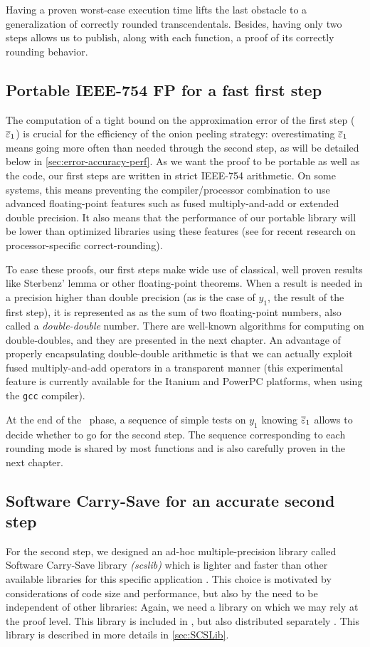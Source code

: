 Having a proven worst-case execution time lifts the last obstacle to a
generalization of correctly rounded transcendentals. Besides, having
only two steps allows us to publish, along with each function, a proof
of its correctly rounding behavior.


\subsection{Portable IEEE-754 FP for a fast first step}
The computation of a tight bound on the approximation error of the
first step (${\overline{\varepsilon}}_1$) is crucial for the efficiency of the onion
peeling strategy: overestimating ${\overline{\varepsilon}}_1$ means going more often
than needed through the second step, as will be detailed below in
\ref{sec:error-accuracy-perf}. As we want the proof to be portable as
well as the code, our first steps are written in strict IEEE-754
arithmetic. On some systems, this means preventing the
compiler/processor combination to use advanced floating-point features
such as fused multiply-and-add or extended double precision. It also
means that the performance of our portable library will be lower than
optimized libraries using these features (see \cite{DinGast2005} for
recent research on processor-specific correct-rounding).

To ease these proofs, our first steps make wide use of classical, well
proven results like Sterbenz' lemma or other floating-point theorems.
When a result is needed in a precision higher than double precision
(as is the case of $y_1$, the result of the first step), it is
represented as as the sum of two floating-point numbers, also called a
\emph{double-double} number.  There are well-known algorithms for
computing on double-doubles, and they are presented in the next
chapter. An advantage of properly encapsulating double-double
arithmetic is that we can actually exploit fused multiply-and-add
operators in a transparent manner (this experimental feature is
currently available for the Itanium and PowerPC platforms, when using
the \texttt{gcc} compiler).

At the end of the \quick\ phase, a sequence of simple tests on
$y_1$ knowing ${\overline{\varepsilon}}_1$ allows to decide whether to go for
the second step. The sequence corresponding to each rounding mode is
shared by most functions and is also carefully proven in the next
chapter.


\subsection{Software Carry-Save for an accurate second step}
For the second step, we designed an ad-hoc multiple-precision library
called Software Carry-Save library \emph{(scslib)} which is lighter
and faster than other available libraries for this specific
application \cite{DefDin2002,DinDef2003}. This choice is motivated by
considerations of code size and performance, but also by the need to
be independent of other libraries: Again, we need a library on which
we may rely at the proof level. This library is included in \crlibm,
but also distributed separately \cite{SCSweb}. This library is
described in more details in \ref{sec:SCSLib}.





